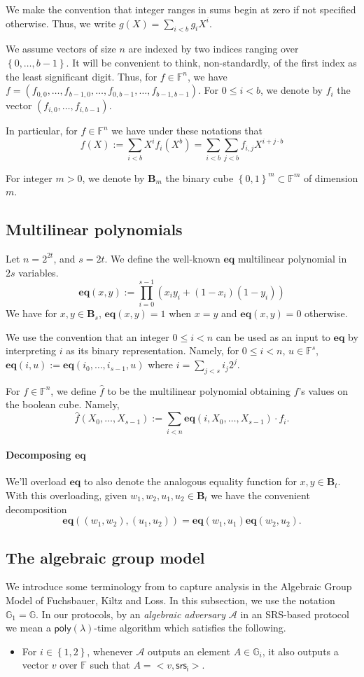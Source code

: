\documentclass[11pt]{article} %
\newcommand{\Gi}{\ensuremath{{\mathbb G}_i}\xspace}
\newcommand{\G}{\ensuremath{{\mathbb G}}\xspace}
\newcommand{\F}{\ensuremath{\mathbb F}\xspace}
\newcommand{\adv}{\ensuremath{\mathcal A}\xspace}
\newcommand{\srsi}{\ensuremath{\mathsf{srs_i}}\xspace}
\newcommand{\defeq}{:=}
\newcommand{\set}[1]{\ensuremath{\left\{#1\right\}}\xspace}
\newcommand{\sumi}[1]{\sum_{i< #1}}
\newcommand{\sumj}[1]{\sum_{j< #1}}
\newcommand{\poly}{\ensuremath{\mathsf{poly(\lambda)}}\xspace}
\newcommand{\eq}{\ensuremath{\mathsf{eq}}\xspace}
\renewcommand{\eq}{\ensuremath{\mathbf{eq}}\xspace}
\newcommand{\mle}[1]{\ensuremath{\hat{#1}}\xspace}
\newcommand{\B}[1]{\ensuremath{\mathbf{B}_{#1}}\xspace}
\begin{document}
We make the convention that integer ranges in sums begin at zero if not specified otherwise. Thus, we write
$g(X)=\sumi{b}g_i X^i$.

We assume vectors of size $n$ are indexed by two indices ranging over $\set{0,\ldots,b-1}$. It will be convenient to think, non-standardly, of the first index as the least significant digit. Thus, for $f\in \F^n$, we have $f=(f_{0,0},\ldots,f_{b-1,0},\ldots,f_{0,b-1},\ldots,f_{b-1,b-1})$.
 For $0\leq i <b$, we denote by $f_i$ the vector $(f_{i,0},\ldots, f_{i,b-1})$.

In particular, for $f\in \F^n$ we have under these notations that
\[f(X)\defeq \sumi{b}X^i f_i(X^b) = \sumi{b}\sumj{b}f_{i,j}X^{i+j\cdot b}\]
 
For integer $m>0$, we denote by \B{m} the binary cube $\set{0,1}^m\subset \F^m$ of dimension $m$.
\subsection{Multilinear polynomials}\label{sec:multilin-polys}
Let $n=2^{2t}$, and $s=2t$.
We define the well-known \eq multilinear polynomial in $2s$ variables. 
\[\eq(x,y) \defeq \prod_{i=0}^{s-1} ( x_i y_i + (1-x_i)(1-y_i))\]
We have for $x,y \in \B{s}$, $\eq(x,y)=1$ when $x=y$ and $\eq(x,y)=0$ otherwise.

We use the convention that an integer $0\leq i < n$ can be used as an input to \eq by interpreting $i$ as its binary representation.
Namely, for $0\leq i <n$, $u\in \F^s$, $\eq(i,u)\defeq \eq(i_0,\ldots, i_{s-1},u)$ where $i=\sumj{s} i_j 2^{j}$.

For $f\in \F^n$, we define $\mle{f}$ to be the multilinear polynomial obtaining $f$'s values on the boolean cube.
Namely,
\[\mle{f}(X_0,\ldots,X_{s-1}) \defeq \sumi{n}\eq(i,X_0,\ldots,X_{s-1})\cdot f_i.\]

\paragraph{Decomposing \eq}
We'll overload \eq to also denote the analogous equality function for $x,y \in \B{t}$.
With this overloading, given $w_1,w_2,u_1,u_2\in \B{t}$ we have the convenient decomposition
\[ \eq( (w_1,w_2),(u_1,u_2)) = \eq(w_1,u_1)\eq(w_2,u_2).\]


\subsection{The algebraic group model}\label{subsec:agm}
We introduce some terminology from \cite{plonk} to capture analysis in the Algebraic Group Model of Fuchsbauer, Kiltz and Loss\cite{AGM}.
In this subsection, we use the notation $\G_1=\G$.
In our protocols, by an \emph{algebraic adversary} \adv in an SRS-based protocol we mean a \poly-time algorithm which satisfies the following.
\begin{itemize}
 \item For $i\in \set{1,2}$, whenever \adv outputs an element $A\in \Gi$, it also outputs a vector $v$ over \F such that $A = <v,\srsi>$.
\end{itemize}
\end{document}
